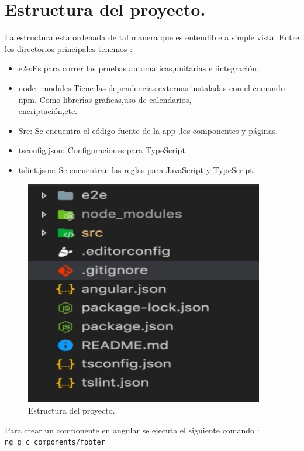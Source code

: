 \section{Estructura del proyecto.}
La estructura esta ordenada de tal manera que es entendible a simple vista .Entre los directorios
principales tenemos :
\begin{itemize}
	\item e2e:Es para correr las pruebas automaticas,unitarias e iintegraci\'on.
	\item node\_modules:Tiene las dependencias externas instaladas con el comando npm.
	Como librer\'\i{}as graficas,uso de calendarios,\\encriptaci\'on,etc.
	\item Src: Se encuentra el c\'odigo fuente de la app ,los componentes y p\'aginas.
	\item tsconfig.json: Configuraciones para TypeScript.
	\item tslint.json: Se encuentran las reglas para JavaScript y TypeScript.
\end{itemize}
\begin{figure}[H] %
	\centering %
	\includegraphics[scale=0.7]{images/c3_4.jpg}
	\caption{Estructura del proyecto.}
\end{figure}
Para crear un componente en angular se ejecuta el siguiente comando :\\
 \texttt{ng g c components/footer}\\

